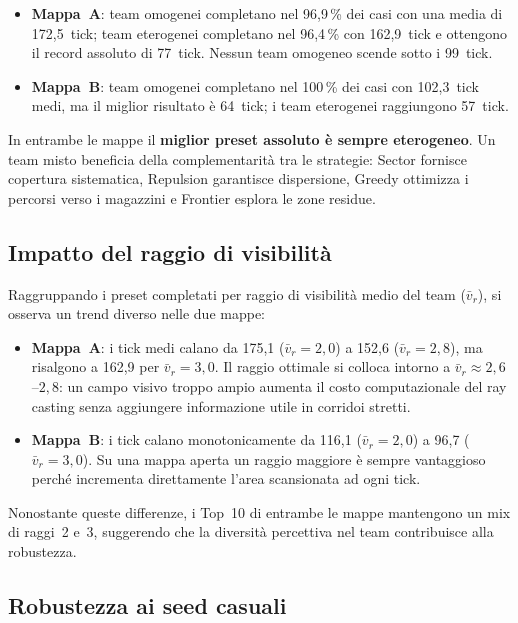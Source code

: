 \begin{itemize}
  \item \textbf{Mappa~A}: team omogenei completano nel 96{,}9\,\% dei casi con una media
        di 172{,}5~tick; team eterogenei completano nel 96{,}4\,\% con 162{,}9~tick
        e ottengono il record assoluto di 77~tick. Nessun team omogeneo scende sotto i 99~tick.
  \item \textbf{Mappa~B}: team omogenei completano nel 100\,\% dei casi con 102{,}3~tick
        medi, ma il miglior risultato \`e 64~tick; i team eterogenei raggiungono 57~tick.
\end{itemize}

In entrambe le mappe il \textbf{miglior preset assoluto \`e sempre eterogeneo}. Un team
misto beneficia della complementarit\`a tra le strategie: Sector fornisce copertura
sistematica, Repulsion garantisce dispersione, Greedy ottimizza i percorsi verso i
magazzini e Frontier esplora le zone residue.

\subsection{Impatto del raggio di visibilit\`a}

Raggruppando i preset completati per raggio di visibilit\`a medio del team ($\bar{v}_r$), si
osserva un trend diverso nelle due mappe:

\begin{itemize}
  \item \textbf{Mappa~A}: i tick medi calano da 175{,}1 ($\bar{v}_r=2{,}0$) a 152{,}6
        ($\bar{v}_r=2{,}8$), ma risalgono a 162{,}9 per $\bar{v}_r=3{,}0$.
        Il raggio ottimale si colloca intorno a $\bar{v}_r \approx 2{,}6$--$2{,}8$:
        un campo visivo troppo ampio aumenta il costo computazionale del ray casting
        senza aggiungere informazione utile in corridoi stretti.
  \item \textbf{Mappa~B}: i tick calano monotonicamente da 116{,}1 ($\bar{v}_r=2{,}0$)
        a 96{,}7 ($\bar{v}_r=3{,}0$).
        Su una mappa aperta un raggio maggiore \`e sempre vantaggioso perch\'e
        incrementa direttamente l'area scansionata ad ogni tick.
\end{itemize}

Nonostante queste differenze, i Top~10 di entrambe le mappe mantengono un mix di raggi~2 e~3,
suggerendo che la diversit\`a percettiva nel team contribuisce alla robustezza.

\subsection{Robustezza ai seed casuali}

